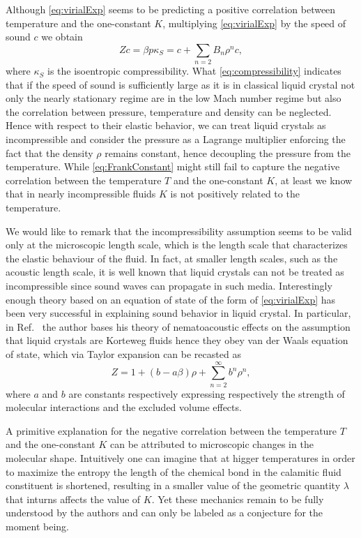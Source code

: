 \documentclass[%
 aip,
 amsmath,amssymb,
 reprint,%
]{revtex4-1}
\begin{document}
Although \eqref{eq:virialExp} seems to be predicting a positive correlation between temperature and the one-constant $K$, multiplying \eqref{eq:virialExp} by the speed of sound $c$ we obtain
\begin{equation}
  Zc = \beta p \kappa_S = c + \sum_{n=2}B_n\rho^nc, \label{eq:compressibility}
\end{equation}
where $\kappa_S$ is the isoentropic compressibility. What \eqref{eq:compressibility} indicates that if the speed of sound is sufficiently large as it is in classical liquid crystal not only the nearly stationary regime are in the low Mach number regime but also the correlation between pressure, temperature and density can be neglected.
Hence with respect to their elastic behavior, we can treat liquid crystals as incompressible and consider the pressure as a Lagrange multiplier enforcing the fact that the density $\rho$ remains constant, hence decoupling the pressure from the temperature.
While \eqref{eq:FrankConstant} might still fail to capture the negative correlation between the temperature $T$ and the one-constant $K$, at least we know that in nearly incompressible fluids $K$ is not positively related to the temperature.

We would like to remark that the incompressibility assumption seems to be valid only at the microscopic length scale, which is the length scale that characterizes the elastic behaviour of the fluid.
In fact, at smaller length scales, such as the acoustic length scale, it is well known that liquid crystals can not be treated as incompressible since sound waves can propagate in such media\cite{MLS72}.
Interestingly enough theory based on an equation of state of the form of \eqref{eq:virialExp} has been very successful in explaining sound behavior in liquid crystal\cite{V09}.
In particular, in Ref.~ the author bases his theory of nematoacoustic effects on the assumption that liquid crystals are Korteweg fluids hence they obey van der Waals equation of state, which via Taylor expansion can be recasted as 
\begin{equation}
  Z = 1 + (b-a\beta) \rho + \sum_{n=2}^\infty b^n\rho^n,
\end{equation}
where $a$ and $b$ are constants respectively expressing respectively the strength of molecular interactions and the excluded volume effects.

A primitive explanation for the negative correlation between the temperature $T$ and the one-constant $K$ can be attributed to microscopic changes in the molecular shape.
Intuitively one can imagine that at higger temperatures in order to maximize the entropy the length of the chemical bond in the calamitic fluid constituent is shortened, resulting in a smaller value of the geometric quantity $\lambda$ that inturns affects the value of $K$.
Yet these mechanics remain to be fully understood by the authors and can only be labeled as a conjecture for the moment being.
\end{document}
